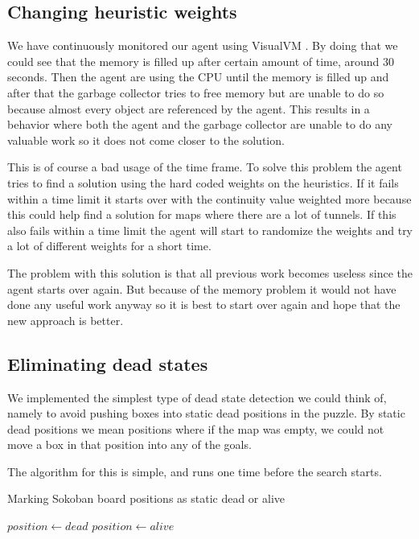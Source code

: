 \documentclass[a4paper,11pt]{article}
\begin{document}
\subsection{Changing heuristic weights}
We have continuously monitored our agent using VisualVM %
. By doing that we could see that the memory is filled up after certain amount of time, around 30 seconds. 
Then the agent are using the CPU until the memory is filled up and after that the garbage collector tries to free 
memory but are unable to do so because almost every object are referenced by the agent. This results in a behavior 
where both the agent and the garbage collector are unable to do any valuable work so it does not come closer to the solution. 

This is of course a bad usage of the time frame. To solve this problem the agent tries to find a solution using the hard coded
weights on the heuristics. If it fails within a time limit it starts over with the continuity value weighted more because this could help 
find a solution for maps where there are a lot of tunnels. If this also fails within a time limit the agent will start to randomize 
the weights and try a lot of different weights for a short time. 

The problem with this solution is that all previous work becomes useless since the agent starts over again. But because of the memory
problem it would not have done any useful work anyway so it is best to start over again and hope that the new approach is better. 

\subsection{Eliminating dead states}

\label{sec:dead}

We implemented the simplest type of dead state detection we could think of,
namely to avoid pushing boxes into static dead positions in the puzzle.
By static dead positions we mean positions where if the map was empty,
we could not move a box in that position into any of the goals.

The algorithm for this is simple, and runs one time before the search starts.

\clearpage
\begin{algorithm}
\caption{Marking Sokoban board positions as static dead or alive}
\label{alg:dead_positions}
\begin{algorithmic}
			\State $position \gets dead$
		\EndFor
					\State $position \gets alive$
				\EndIf
			\EndFor
		\EndFor
	\EndFunction
\end{algorithmic}
\end{algorithm}
\end{document}

